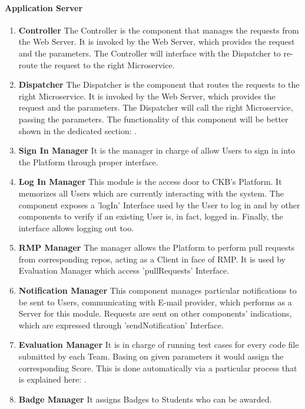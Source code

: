 \paragraph{Application Server}
\begin{enumerate}
    \item \textbf{Controller} The Controller is the component that manages the requests from the Web Server. It is invoked by the Web Server, which provides the request and the parameters. The Controller will interface with the 
    Dispatcher to re-route the request to the right Microservice.
    \item \textbf{Dispatcher} The Dispatcher is the component that routes the requests to the right Microservice. It is invoked by the Web Server, which provides the request and the parameters. The Dispatcher will call the right Microservice, passing the parameters. The functionality of this component will be better shown in the dedicated section: .
    \item \textbf{Sign In Manager} It is the manager in charge of allow Users to sign in into the Platform through proper interface.
    \item \textbf{Log In Manager} This module is the access door to CKB's Platform. It memorizes all Users which are currently interacting with the system. The component exposes a 'logIn' Interface used by the User to log in 
    and by other components to verify if an existing User is, in fact, logged in. Finally, the interface allows logging out too.
    \item \textbf{RMP Manager} The manager allows the Platform to perform pull requests from corresponding repos, acting as a Client in face of RMP. It is used by Evaluation Manager which access 'pullRequests' Interface.
    \item \textbf{Notification Manager} This component manages particular notifications to be sent to Users, communicating with E-mail provider, which performs as a Server for this module. Requests are sent on other 
    components' indications, which are expressed through 'sendNotification' Interface.
    \item \textbf{Evaluation Manager} It is in charge of running test cases for every code file submitted by each Team. Basing on given parameters it would assign the corresponding Score. This is done automatically via a particular process that is explained here: .
    \item \textbf{Badge Manager} It assigns Badges to Students who can be awarded. 

\end{enumerate}
